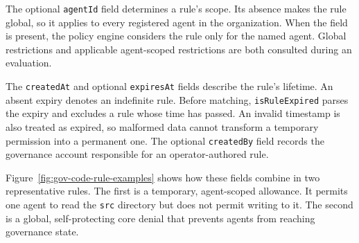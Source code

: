 The optional \texttt{agentId} field determines a rule's scope. Its absence
makes the rule global, so it applies to every registered agent in the
organization. When the field is present, the policy engine considers the rule
only for the named agent.
Global restrictions and applicable agent-scoped restrictions are both
consulted during an evaluation.

The \texttt{createdAt} and optional \texttt{expiresAt} fields describe the
rule's lifetime. An absent expiry denotes an indefinite rule. Before matching,
\texttt{isRuleExpired} parses the expiry and excludes a rule whose time has
passed. An invalid timestamp is also treated as expired, so malformed data
cannot transform a temporary permission into a permanent one. The
optional \texttt{createdBy} field records the governance account responsible
for an operator-authored rule.

Figure~\ref{fig:gov-code-rule-examples} shows how these fields combine in two
representative rules. The first is a temporary, agent-scoped allowance. It
permits one agent to read the \texttt{src} directory but does not permit
writing to it. The second is a global, self-protecting core denial that prevents
agents from reaching governance state.

